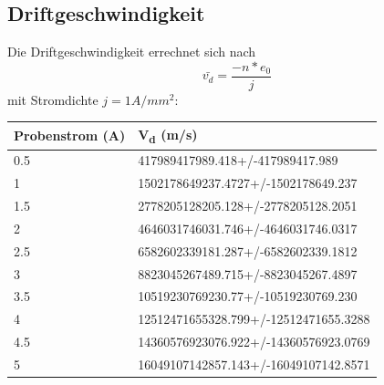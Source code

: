 \documentclass[titlepage=firstcover, captions=tableheading]{scrartcl}
\begin{document}
\subsection{Driftgeschwindigkeit}
Die Driftgeschwindigkeit errechnet sich nach
\begin{equation}
    \bar{v_d}=\frac{-n*e_0}{j}
\end{equation}
mit Stromdichte $j=1 A/mm^2$:
\begin{center}
    \begin{tabular}{ll}
        \toprule
        Probenstrom (A) & V\textsubscript{d} (m/s) \\
        \midrule  
        0.5       & 417989417989.418+/-417989417.989     \\
        1         &  1502178649237.4727+/-1502178649.237  \\
        1.5       &   2778205128205.128+/-2778205128.2051  \\
        2         &   4646031746031.746+/-4646031746.0317  \\
        2.5       &   6582602339181.287+/-6582602339.1812 \\
        3         &  8823045267489.715+/-8823045267.4897  \\
        3.5       &   10519230769230.77+/-10519230769.230 \\
        4         &   12512471655328.799+/-12512471655.3288    \\
        4.5       &   14360576923076.922+/-14360576923.0769  \\
        5         &   16049107142857.143+/-16049107142.8571   \\
        \bottomrule
    \end{tabular}
\end{center}
\end{document}
